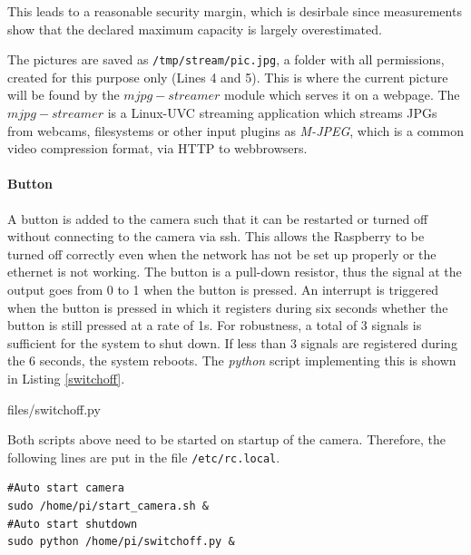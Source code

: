 This leads to a reasonable security margin, which is desirbale since measurements show that the declared maximum capacity is largely overestimated. %

The pictures are saved as \texttt{/tmp/stream/pic.jpg}, a folder with all permissions, created for this purpose only (Lines 4 and 5).
This is where the current picture will be found by the $mjpg-streamer$ module which serves it on a webpage. 
The $mjpg-streamer$ is a Linux-UVC streaming application which streams JPGs from webcams, filesystems or other input plugins as \textit{M-JPEG}, which is a common video compression format, via HTTP to webbrowsers.


\paragraph{Button}

A button is added to the camera such that it can be restarted or turned off without connecting to the camera via ssh. This allows the Raspberry to be turned off correctly even when the network has not be set up properly or the ethernet is not working.
The button is a pull-down resistor, thus the signal at the output goes from 0 to 1 when the button is pressed. 
An interrupt is triggered when the button is pressed in which it registers during six seconds whether the button is still pressed at a rate of 1s. For robustness, a total of 3 signals is sufficient for the system to shut down. If less than 3 signals are registered during the 6 seconds, the system reboots. 
The \textit{python} script implementing this is shown in Listing \ref{switchoff}.

\begin{center}
\begin{minipage}{0.9\linewidth}
    \begin{lstinputlisting}[caption=\texttt{$\sim$\/switchoff.py}, label=switchoff, language=Python, frame=none]{files/switchoff.py}
\end{lstinputlisting}
\end{minipage}
\end{center}


Both scripts above need to be started on startup of the camera. Therefore, the following lines are put in the file \texttt{/etc/rc.local}.
\begin{center}
\begin{minipage}{0.9\linewidth}
    \begin{lstlisting}[caption=\texttt{/etc/rc.local}, label=local, frame=none]
#Auto start camera
sudo /home/pi/start_camera.sh &
#Auto start shutdown
sudo python /home/pi/switchoff.py &
\end{lstlisting}
\end{minipage}
\end{center}


